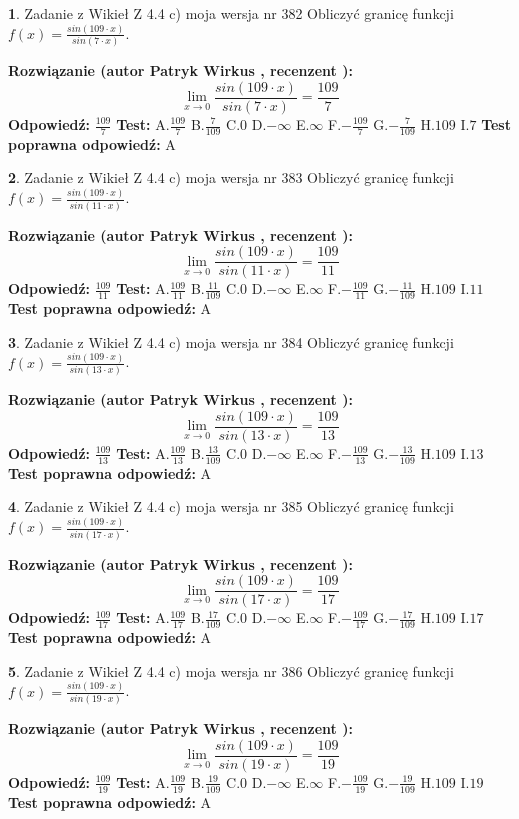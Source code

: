 \documentclass[12pt, a4paper]{article}
\theoremstyle{definition} %
\newtheorem{zad}{}
\newcommand{\zadStart}[1]{\begin{zad}#1\newline}
\newcommand{\zadStop}{\end{zad}}
\newcommand{\rozwStart}[2]{\noindent \textbf{Rozwiązanie (autor #1 , recenzent #2): }\newline}
\newcommand{\rozwStop}{\newline}
\newcommand{\odpStart}{\noindent \textbf{Odpowiedź:}\newline}
\newcommand{\odpStop}{\newline}
\newcommand{\testStart}{\noindent \textbf{Test:}\newline}
\newcommand{\testStop}{\newline}
\newcommand{\kluczStart}{\noindent \textbf{Test poprawna odpowiedź:}\newline}
\newcommand{\kluczStop}{\newline}
\begin{document}
\zadStart{Zadanie z Wikieł Z 4.4 c) moja wersja nr 382}
Obliczyć granicę funkcji $f(x)=\frac{sin(109\cdot x)}{sin(7\cdot x)}$.
\zadStop
\rozwStart{Patryk Wirkus}{}
$$\lim\limits_{x\to 0}\frac{sin(109\cdot x)}{sin(7\cdot x)}=
\frac{109}{7}$$
\rozwStop
\odpStart
$\frac{109}{7}$
\odpStop
\testStart
A.$\frac{109}{7}$
B.$\frac{7}{109}$
C.$0$
D.$-\infty$
E.$\infty$
F.$-\frac{109}{7}$
G.$-\frac{7}{109}$
H.$109$
I.$7$
\testStop
\kluczStart
A
\kluczStop



\zadStart{Zadanie z Wikieł Z 4.4 c) moja wersja nr 383}
Obliczyć granicę funkcji $f(x)=\frac{sin(109\cdot x)}{sin(11\cdot x)}$.
\zadStop
\rozwStart{Patryk Wirkus}{}
$$\lim\limits_{x\to 0}\frac{sin(109\cdot x)}{sin(11\cdot x)}=
\frac{109}{11}$$
\rozwStop
\odpStart
$\frac{109}{11}$
\odpStop
\testStart
A.$\frac{109}{11}$
B.$\frac{11}{109}$
C.$0$
D.$-\infty$
E.$\infty$
F.$-\frac{109}{11}$
G.$-\frac{11}{109}$
H.$109$
I.$11$
\testStop
\kluczStart
A
\kluczStop



\zadStart{Zadanie z Wikieł Z 4.4 c) moja wersja nr 384}
Obliczyć granicę funkcji $f(x)=\frac{sin(109\cdot x)}{sin(13\cdot x)}$.
\zadStop
\rozwStart{Patryk Wirkus}{}
$$\lim\limits_{x\to 0}\frac{sin(109\cdot x)}{sin(13\cdot x)}=
\frac{109}{13}$$
\rozwStop
\odpStart
$\frac{109}{13}$
\odpStop
\testStart
A.$\frac{109}{13}$
B.$\frac{13}{109}$
C.$0$
D.$-\infty$
E.$\infty$
F.$-\frac{109}{13}$
G.$-\frac{13}{109}$
H.$109$
I.$13$
\testStop
\kluczStart
A
\kluczStop



\zadStart{Zadanie z Wikieł Z 4.4 c) moja wersja nr 385}
Obliczyć granicę funkcji $f(x)=\frac{sin(109\cdot x)}{sin(17\cdot x)}$.
\zadStop
\rozwStart{Patryk Wirkus}{}
$$\lim\limits_{x\to 0}\frac{sin(109\cdot x)}{sin(17\cdot x)}=
\frac{109}{17}$$
\rozwStop
\odpStart
$\frac{109}{17}$
\odpStop
\testStart
A.$\frac{109}{17}$
B.$\frac{17}{109}$
C.$0$
D.$-\infty$
E.$\infty$
F.$-\frac{109}{17}$
G.$-\frac{17}{109}$
H.$109$
I.$17$
\testStop
\kluczStart
A
\kluczStop



\zadStart{Zadanie z Wikieł Z 4.4 c) moja wersja nr 386}
Obliczyć granicę funkcji $f(x)=\frac{sin(109\cdot x)}{sin(19\cdot x)}$.
\zadStop
\rozwStart{Patryk Wirkus}{}
$$\lim\limits_{x\to 0}\frac{sin(109\cdot x)}{sin(19\cdot x)}=
\frac{109}{19}$$
\rozwStop
\odpStart
$\frac{109}{19}$
\odpStop
\testStart
A.$\frac{109}{19}$
B.$\frac{19}{109}$
C.$0$
D.$-\infty$
E.$\infty$
F.$-\frac{109}{19}$
G.$-\frac{19}{109}$
H.$109$
I.$19$
\testStop
\kluczStart
A
\kluczStop
\end{document}
